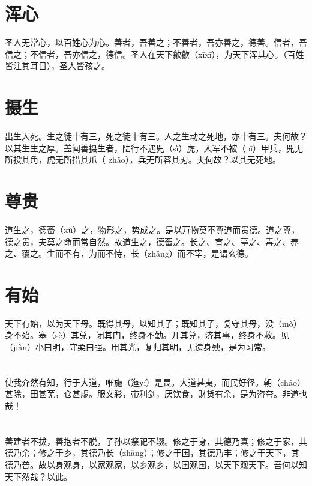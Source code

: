 \documentclass[a4paper,12pt,UTF8,twoside]{ctexbook}
\begin{document}
	
	

	\chapter{浑心}
	
	圣人无常心，以百姓心为心。善者，吾善之；不善者，吾亦善之，德善。信者，吾信之；不信者，吾亦信之，德信。圣人在天下歙歙（xīxī），为天下浑其心。（百姓皆注其耳目），圣人皆孩之。
	
	
	
	
	\chapter{摄生}
	出生入死。生之徒十有三，死之徒十有三。人之生动之死地，亦十有三。夫何故？以其生生之厚。盖闻善摄生者，陆行不遇兕（sì）虎，入军不被（pī）甲兵，兕无所投其角，虎无所措其爪（	zhǎo），兵无所容其刃。夫何故？以其无死地。
	
	
	
	\chapter{尊贵}
	道生之，德畜（xù）之，物形之，势成之。是以万物莫不尊道而贵德。道之尊，德之贵，夫莫之命而常自然。故道生之，德畜之。长之、育之、亭之、毒之、养之、覆之。生而不有，为而不恃，长（zhǎng）而不宰，是谓玄德。
	\chapter{有始}
	
	天下有始，以为天下母。既得其母，以知其子；既知其子，复守其母，没（mò）身不殆。塞（sè）其兑，闭其门，终身不勤。开其兑，济其事，终身不救。见（jiàn）小曰明，守柔曰强。用其光，复归其明，无遗身殃，是为习常。
	
	\chapter{}	
	
	使我介然有知，行于大道，唯施（迤yí）是畏。大道甚夷，而民好径。朝（cháo）甚除，田甚芜，仓甚虚。服文彩，带利剑，厌饮食，财货有余，是为盗夸。非道也哉！
	
	\chapter{}	
	
	善建者不拔，善抱者不脱，子孙以祭祀不辍。修之于身，其德乃真；修之于家，其德乃余；修之于乡，其德乃长（zhǎng）；修之于国，其德乃丰；修之于天下，其德乃普。故以身观身，以家观家，以乡观乡，以国观国，以天下观天下。吾何以知天下然哉？以此。
	
\end{document}
